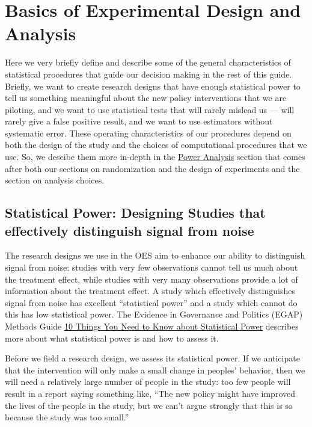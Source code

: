 \documentclass[
  12pt,
]{book}
\theoremstyle{definition}
\theoremstyle{definition}
\theoremstyle{definition}
\theoremstyle{remark}
\begin{document}
\hypertarget{basics-of-experimental-design-and-analysis}{%
\chapter{Basics of Experimental Design and
Analysis}\label{basics-of-experimental-design-and-analysis}}

Here we very briefly define and describe some of the general
characteristics of statistical procedures that guide our decision making
in the rest of this guide. Briefly, we want to create research designs
that have enough statistical power to tell us something meaningful about
the new policy interventions that we are piloting, and we want to use
statistical tests that will rarely mislead us --- will rarely give a
false positive result, and we want to use estimators without systematic
error. These operating characteristics of our procedures depend on both
the design of the study and the choices of computational procedures that
we use. So, we descibe them more in-depth in the
\protect\hyperlink{poweranalysis}{Power Analysis} section that comes
after both our sections on randomization and the design of experiments
and the section on analysis choices.

\hypertarget{statistical-power-designing-studies-that-effectively-distinguish-signal-from-noise}{%
\section{Statistical Power: Designing Studies that effectively
distinguish signal from
noise}\label{statistical-power-designing-studies-that-effectively-distinguish-signal-from-noise}}

The research designs we use in the OES aim to enhance our ability to
distinguish signal from noise: studies with very few observations cannot
tell us much about the treatment effect, while studies with very many
observations provide a lot of information about the treatment effect. A
study which effectively distinguishes signal from noise has excellent
``statistical power'' and a study which cannot do this has low
statistical power. The Evidence in Governance and Politics (EGAP)
Methods Guide
\href{https://egap.org/methods-guides/10-things-you-need-know-about-statistical-power}{10
Things You Need to Know about Statistical Power} describes more about
what statistical power is and how to assess it.

Before we field a research design, we assess its statistical power. If
we anticipate that the intervention will only make a small change in
peoples' behavior, then we will need a relatively large number of people
in the study: too few people will result in a report saying something
like, ``The new policy might have improved the lives of the people in
the study, but we can't argue strongly that this is so because the study
was too small.''
\end{document}
